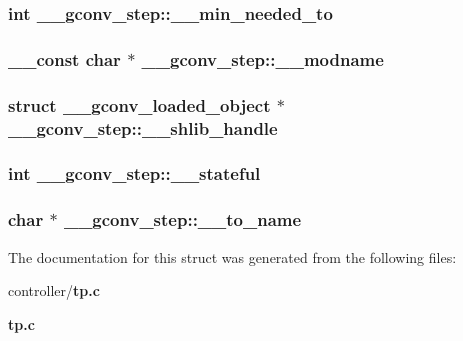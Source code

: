 \subsubsection[{\_\-\_\-min\_\-needed\_\-to}]{\setlength{\rightskip}{0pt plus 5cm}int {\bf \_\-\_\-gconv\_\-step::\_\-\_\-min\_\-needed\_\-to}}\label{struct____gconv__step_aaadaef5c845fa9ad8aa0ec211aeedd72}
\subsubsection[{\_\-\_\-modname}]{\setlength{\rightskip}{0pt plus 5cm}\_\-\_\-const char $\ast$ {\bf \_\-\_\-gconv\_\-step::\_\-\_\-modname}}\label{struct____gconv__step_a20f6f55c55f603d7e0ea1a7bdb785e13}
\subsubsection[{\_\-\_\-shlib\_\-handle}]{\setlength{\rightskip}{0pt plus 5cm}struct \_\-\_\-gconv\_\-loaded\_\-object $\ast$ {\bf \_\-\_\-gconv\_\-step::\_\-\_\-shlib\_\-handle}}\label{struct____gconv__step_a391605a6fe80f6bb62dd04ccb84bebc3}
\subsubsection[{\_\-\_\-stateful}]{\setlength{\rightskip}{0pt plus 5cm}int {\bf \_\-\_\-gconv\_\-step::\_\-\_\-stateful}}\label{struct____gconv__step_ada52712d7761b90d76dc6dcec08c08e3}
\subsubsection[{\_\-\_\-to\_\-name}]{\setlength{\rightskip}{0pt plus 5cm}char $\ast$ {\bf \_\-\_\-gconv\_\-step::\_\-\_\-to\_\-name}}\label{struct____gconv__step_a410a67485ec6b4841ef8994c1da5df3a}


The documentation for this struct was generated from the following files:\begin{DoxyCompactItemize}
\item 
controller/{\bf tp.c}\item 
{\bf tp.c}\end{DoxyCompactItemize}
